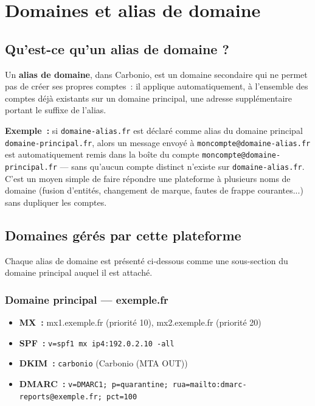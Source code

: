 \documentclass[11pt,a4paper]{report}
\begin{document}
\section{Domaines et alias de domaine}

\subsection{Qu'est-ce qu'un alias de domaine ?}
Un \textbf{alias de domaine}, dans Carbonio, est un domaine secondaire qui ne permet pas de créer ses propres comptes~: il applique automatiquement, à l'ensemble des comptes déjà existants sur un domaine principal, une adresse supplémentaire portant le suffixe de l'alias.

\textbf{Exemple~:} si \texttt{domaine-alias.fr} est déclaré comme alias du domaine principal \texttt{domaine-principal.fr}, alors un message envoyé à \texttt{moncompte@domaine-alias.fr} est automatiquement remis dans la boîte du compte \texttt{moncompte@domaine-principal.fr} --- sans qu'aucun compte distinct n'existe sur \texttt{domaine-alias.fr}. C'est un moyen simple de faire répondre une plateforme à plusieurs noms de domaine (fusion d'entités, changement de marque, fautes de frappe courantes...) sans dupliquer les comptes.

\subsection{Domaines gérés par cette plateforme}
Chaque alias de domaine est présenté ci-dessous comme une sous-section du domaine principal auquel il est attaché.

\subsubsection{Domaine principal --- exemple.\allowbreak{}fr}
\begin{itemize}[nosep]
  \item \textbf{MX~:} mx1.\allowbreak{}exemple.\allowbreak{}fr (priorité 10), mx2.\allowbreak{}exemple.\allowbreak{}fr (priorité 20)  \item \textbf{SPF~:} \texttt{v=spf1 mx ip4:192.\allowbreak{}0.\allowbreak{}2.\allowbreak{}10 -\allowbreak{}all}  \item \textbf{DKIM~:} \texttt{carbonio} (Carbonio (MTA OUT))  \item \textbf{DMARC~:} \texttt{v=DMARC1; p=quarantine; rua=mailto:dmarc-\allowbreak{}reports@exemple.\allowbreak{}fr; pct=100}\end{itemize}
\end{document}
